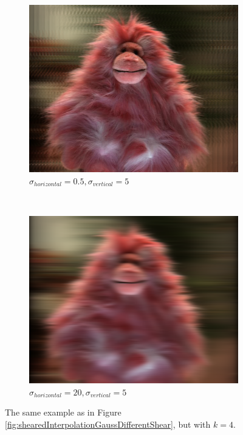 \documentclass[a4paper]{article}
\begin{document}
\begin{figure}[ht]
	\vspace{2mm}
	\begin{subfigure}[h]{0.48\textwidth}
	  \includegraphics[width=\textwidth]{shearedGauss_k1_shear16_sighor0-5_sigvert5}
	  \caption*{$\sigma_{horizontal} = 0.5, \sigma_{vertical} = 5$}
	\end{subfigure}
    	~
	\begin{subfigure}[h]{0.48\textwidth}
	  \includegraphics[width=\textwidth]{shearedGauss_k1_shear16_sighor20_sigvert5}
	  \caption*{$\sigma_{horizontal} = 20, \sigma_{vertical} = 5$}
	\end{subfigure}
\caption{The same example as in Figure \ref{fig:shearedInterpolationGaussDifferentShear}, but with $k=4$.}
\label{fig:shearedInterpolationGaussDifferentFilterSize2}
\end{figure}
\end{document}
